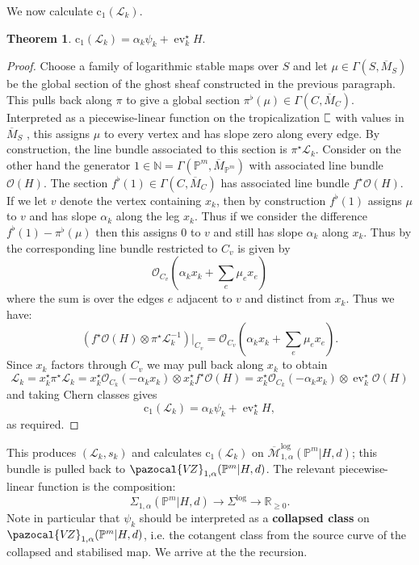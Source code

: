 \documentclass[11pt]{amsart}
\newcommand{\sqC}{\scalebox{0.8}[1.3]{$\sqsubset$}}
\newcommand{\MLog}{\overline{\mathcal{M}}^{\operatorname{log}}}
\newcommand{\PP}{\mathbb P}
\newcommand{\VZ}{\pazocal{V\!Z}}
\newcommand{\st}{\star}
\newcommand{\N}{\mathbb{N}}
\newcommand{\OO}{\mathcal{O}}
\renewcommand{\to}{\rightarrow}
\newcommand{\ev}{\operatorname{ev}}
\newcommand{\Lcal}{\mathcal{L}}
\newcommand{\cchern}{\mathrm{c}}
\newcommand{\ol}[1]{\overline{#1}}
\newcommand{\RR}{\mathbb{R}}
\theoremstyle{definition}
\newtheorem{thm}{Theorem}[section]
\theoremstyle{definition}
\begin{document}
We now calculate $\cchern_1(\Lcal_k)$. 
\begin{thm} $\cchern_1(\Lcal_k) = \alpha_k \psi_k + \ev_k^\st H.$\end{thm}
\begin{proof}
Choose a family of logarithmic stable maps over $S$ and let $\mu \in \Gamma(S,\ol{M}_S)$ be the global section of the ghost sheaf constructed in the previous paragraph. This pulls back along $\pi$ to give a global section $\pi^\flat(\mu) \in \Gamma(C,\ol{M}_C)$.  Interpreted as a piecewise-linear function on the tropicalization $\sqC$ with values in $\ol{M}_S$ \cite[Remark 7.3]{CavalieriChanUlirschWise}, this assigns $\mu$ to every vertex and has slope zero along every edge. By construction, the line bundle associated to this section is $\pi^\st \Lcal_k$. Consider on the other hand the generator $1 \in \N = \Gamma(\PP^m,\ol{M}_{\PP^m})$ with associated line bundle $\OO(H)$. The section $f^\flat(1) \in \Gamma(C,\ol{M}_C)$ has associated line bundle $f^\st\OO(H)$. If we let $v$ denote the vertex containing $x_k$, then by construction $f^\flat(1)$ assigns $\mu$ to $v$ and has slope $\alpha_k$ along the leg $x_k$. Thus if we consider the difference $f^\flat(1) - \pi^\flat(\mu)$ then this assigns $0$ to $v$ and still has slope $\alpha_k$ along $x_k$. Thus by \cite[Proposition 2.4.1]{RSPW} the corresponding line bundle restricted to $C_v$ is given by
\begin{equation*} \OO_{C_v} \left(\alpha_k x_k + \sum_e \mu_e x_e \right) \end{equation*}
where the sum is over the edges $e$ adjacent to $v$ and distinct from $x_k$. Thus we have:
\begin{equation*} \left( f^\st\OO(H) \otimes \pi^\st \Lcal_k^{-1} \right) \big|_{C_v} = \OO_{C_v} \left(\alpha_k x_k + \sum_e \mu_e x_e \right).\end{equation*}
Since $x_k$ factors through $C_v$ we may pull back along $x_k$ to obtain
\begin{equation*} \Lcal_k = x_k^\st\pi^\st \Lcal_k = x_k^\st \OO_{C_k}(-\alpha_k x_k) \otimes x_k^\st f^\st\OO(H) = x_k^\st \OO_{C_k}(-\alpha_k x_k) \otimes \ev_k^\st \OO(H) \end{equation*}
and taking Chern classes gives
\begin{equation*} \cchern_1(\Lcal_k) = \alpha_k \psi_k + \ev_k^\st H,\end{equation*}
as required.\end{proof}
This produces $(\Lcal_k,s_k)$ and calculates $\cchern_1(\Lcal_k)$ on $\MLog_{1,\alpha}(\PP^m|H,d)$; this bundle is pulled back to $\VZ_{1,\alpha}(\PP^m|H,d)$. The relevant piecewise-linear function is the composition:
\begin{equation*} \Sigma_{1,\alpha}(\PP^m|H,d) \to \Sigma^{\log} \to \RR_{\geq 0}.\end{equation*}
Note in particular that $\psi_k$ should be interpreted as a \textbf{collapsed class} on $\VZ_{1,\alpha}(\PP^m|H,d)$, i.e. the cotangent class from the source curve of the collapsed and stabilised map. We arrive at the the recursion. 
\end{document}
